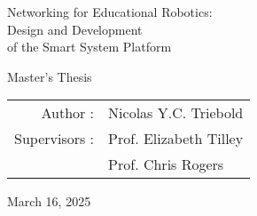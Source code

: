 \newpage%
\clearpage%

\begin{titlepage}%



\begin{center}

%




\vspace*{5cm}%
{\Huge Networking for Educational Robotics:\\ Design and Development \\ of the Smart System Platform\par}

\vspace{2.5cm}%
{\LARGE Master's Thesis}
\vspace{2.5cm}%
        
{\large\begin{tabular}{rl}
    Author : & Nicolas Y.C. Triebold \\
    Supervisors :   & Prof. Elizabeth Tilley \\
                    & Prof. Chris Rogers \\
    \end{tabular}}%
\vfill%
March 16, 2025%
\end{center}%
\end{titlepage}%